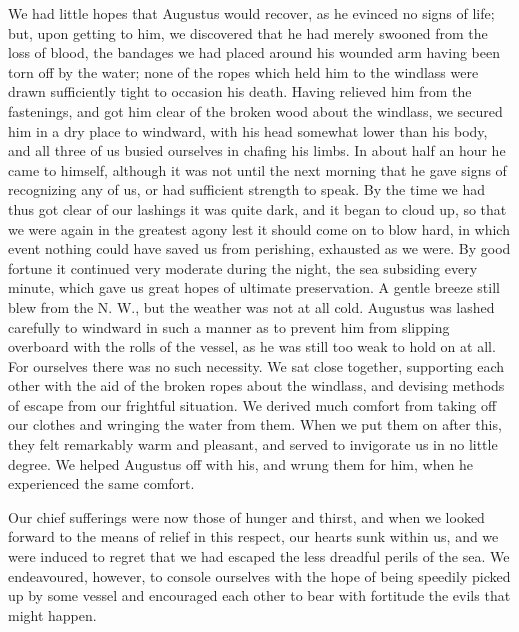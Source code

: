 We had little hopes that Augustus would recover, as he evinced no signs of
life; but, upon getting to him, we discovered that he had merely swooned from
the loss of blood, the bandages we had placed around his wounded arm having been
torn off by the water; none of the ropes which held him to the windlass were
drawn sufficiently tight to occasion his death. Having relieved him from the
fastenings, and got him clear of the broken wood about the windlass, we secured
him in a dry place to windward, with his head somewhat lower than his body, and
all three of us busied ourselves in chafing his limbs. In about half an hour he
came to himself, although it was not until the next morning that he gave signs
of recognizing any of us, or had sufficient strength to speak. By the time we
had thus got clear of our lashings it was quite dark, and it began to cloud up,
so that we were again in the greatest agony lest it should come on to blow hard,
in which event nothing could have saved us from perishing, exhausted as we were.
By good fortune it continued very moderate during the night, the sea subsiding
every minute, which gave us great hopes of ultimate preservation. A gentle
breeze still blew from the N. W., but the weather was not at all cold. Augustus
was lashed carefully to windward in such a manner as to prevent him from
slipping overboard with the rolls of the vessel, as he was still too weak to
hold on at all. For ourselves there was no such necessity. We sat close
together, supporting each other with the aid of the broken ropes about the
windlass, and devising methods of escape from our frightful situation. We
derived much comfort from taking off our clothes and wringing the water from
them. When we put them on after this, they felt remarkably warm and pleasant,
and served to invigorate us in no little degree. We helped Augustus off with
his, and wrung them for him, when he experienced the same comfort. 

Our chief sufferings were now those of hunger and thirst, and when we looked
forward to the means of relief in this respect, our hearts sunk within us, and
we were induced to regret that we had escaped the less dreadful perils of the
sea. We endeavoured, however, to console ourselves with the hope of being
speedily picked up by some vessel and encouraged each other to bear with
fortitude the evils that might happen. 


